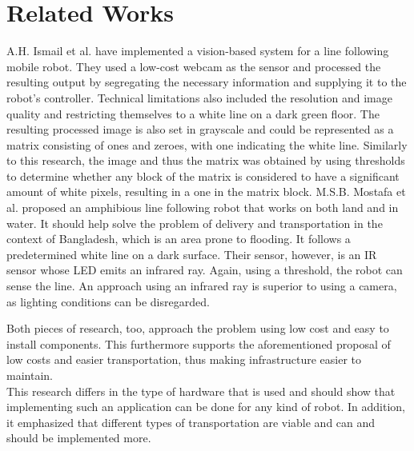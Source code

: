 \documentclass[a4paper, 10pt, conference]{IEEEtran}
\begin{document}
\section{Related Works}
A.H. Ismail et al. \cite{5356366} have implemented a vision-based system for a line following mobile robot. They used a low-cost webcam as the sensor and processed the resulting output by segregating the necessary information and supplying it to the robot’s controller. Technical limitations also included the resolution and image quality and restricting themselves to a white line on a dark green floor. The resulting processed image is also set in grayscale and could be represented as a matrix consisting of ones and zeroes, with one indicating the white line. Similarly to this research, the image and thus the matrix was obtained by using thresholds to determine whether any block of the matrix is considered to have a significant amount of white pixels, resulting in a one in the matrix block.
M.S.B. Mostafa et al. \cite{8679260} proposed an amphibious line following robot that works on both land and in water. It should help solve the problem of delivery and transportation in the context of Bangladesh, which is an area prone to flooding. It follows a predetermined white line on a dark surface. Their sensor, however, is an IR sensor whose LED emits an infrared ray. Again, using a threshold, the robot can sense the line. An approach using an infrared ray is superior to using a camera, as lighting conditions can be disregarded.\\\par
Both pieces of research, too, approach the problem using low cost and easy to install components. This furthermore supports the aforementioned proposal of low costs and easier transportation, thus making infrastructure easier to maintain.\\
This research differs in the type of hardware that is used and should show that implementing such an application can be done for any kind of robot. In addition, it emphasized that different types of transportation are viable and can and should be implemented more.
\end{document}
